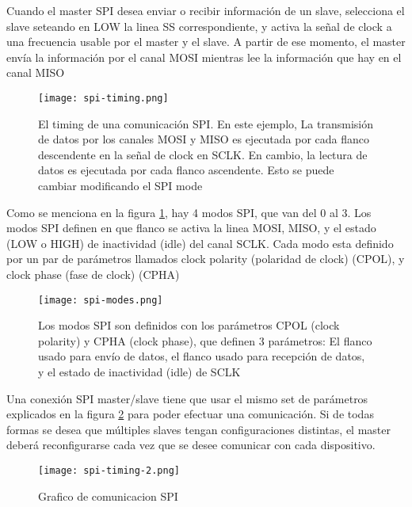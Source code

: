 \documentclass[../informe_krapp.tex]{subfiles}
\begin{document}
Cuando el master SPI desea enviar o recibir información de un slave, selecciona el
slave seteando en LOW la linea SS correspondiente, y activa la señal de clock a una
frecuencia usable por el master y el slave.
A partir de ese momento, el master envía la información por el canal MOSI mientras lee
la información que hay en el canal MISO

\begin{figure}[H]
	\centering
	\texttt{[image: spi-timing.png]}
	\caption{El timing de una comunicación SPI. En este ejemplo,
		La transmisión de datos por los canales MOSI y MISO es ejecutada por
		cada flanco descendente en la señal de clock en SCLK. En cambio,
		la lectura de datos es ejecutada por cada flanco ascendente.
		Esto se puede cambiar modificando el SPI mode }
	\label{spi-timing}
\end{figure}

Como se menciona en la figura \ref{spi-timing}, hay 4 modos SPI, que van del 0 al 3.
Los modos SPI definen en que flanco se activa la linea MOSI, MISO, y el estado (LOW o HIGH)
de inactividad (idle) del canal SCLK.
Cada modo esta definido por un par de parámetros llamados clock polarity
(polaridad de clock) (CPOL), y clock phase (fase de clock) (CPHA)

\begin{figure}[H]
	\centering
	\texttt{[image: spi-modes.png]}
	\caption{Los modos SPI son definidos con los parámetros CPOL (clock polarity) y CPHA
		(clock phase), que definen 3 parámetros: El flanco usado para envío de datos, el
		flanco usado para recepción de datos, y el estado de inactividad (idle) de SCLK}
	\label{spi-modes}
\end{figure}

Una conexión SPI master/slave tiene que usar el mismo set de parámetros explicados
en la figura \ref{spi-modes} para poder efectuar una comunicación.
Si de todas formas se desea que múltiples slaves tengan configuraciones distintas,
el master deberá reconfigurarse cada vez que se desee comunicar con cada dispositivo.
\begin{figure}[H]
	\centering
	\texttt{[image: spi-timing-2.png]}
	\caption{Grafico de comunicacion SPI}
\end{figure}
\end{document}
